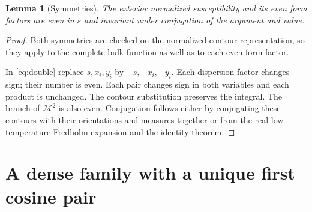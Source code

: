 \documentclass[11pt]{article}
\numberwithin{equation}{section}
\newtheorem{lemma}[theorem]{Lemma}
\theoremstyle{definition}
\newcommand{\M}{\mathcal M}
\begin{document}
\begin{lemma}[Symmetries]\label{lem:symmetry}
The exterior normalized susceptibility and its even form factors are even
in \(s\) and invariant under conjugation of the argument and value.
\end{lemma}
\begin{proof}
Both symmetries are checked on the normalized contour representation, so they apply to the complete bulk function as well as to each even form factor.

In \eqref{eq:double} replace \(s,x_i,y_i\) by \(-s,-x_i,-y_i\).
Each dispersion factor changes sign; their number is even. Each pair
changes sign in both variables and each product is unchanged.
The contour substitution preserves the integral. The branch of \(\M^2\)
is also even. Conjugation follows either by conjugating these contours
with their orientations and measures together or from the real
low-temperature Fredholm expansion and the identity theorem.
\end{proof}



\section{A dense family with a unique first cosine pair}
\label{sec:arithmetic}
\end{document}
